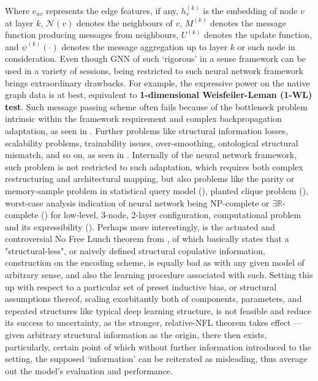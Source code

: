 Where $e_{uv}$ represents the edge features, if any, $h^{(k)}_{v}$ is the embedding of node $v$ at layer $k$, $\mathcal{N}(v)$ denotes the neighbours of $v$, $M^{(k)}$ denotes the message function producing messages from neighbours, $U^{(k)}$ denotes the update function, and $\psi^{(k)}(\cdot)$ denotes the message aggregation up to layer $k$ or such node in consideration. Even though GNN of such `rigorous' in a sense framework can be used in a variety of sessions, being restricted to such neural network framework brings extraordinary drawbacks. For example, the expressive power on the native graph data is at best, equivalent to \textbf{1-dimensional Weisfeiler-Leman (1-WL) test}. Such message passing scheme often fails because of the bottleneck problem intrinsic within the framework requirement and complex backpropagation adaptation, as seen in \cite{alon2021bottleneckgraphneuralnetworks}. Further problems like structural information losses, scalability problems, trainability issues, over-smoothing, ontological structural mismatch, and so on, as seen in \cite{NEURIPS2019_bb04af0f}. Internally of the neural network framework, such problem is not restricted to such adaptation, which requires both complex restructuring and architectural mapping, but also problems like the parity or memory-sample problem in statistical query model (\cite{blum2003noise,garg2021memory}), planted clique problem (\cite{barak2016nearly}), worst-case analysis indication of neural network being NP-complete or $\exists\mathbb{R}$-complete (\cite{blum1992training,abrahamsen2021existential}) for low-level, 3-node, 2-layer configuration, computational problem and its expressibility (\cite{eldan2016power,telgarsky2016benefits,siegelmann1991turing,weiss2018practical}). Perhaps more interestingly, is the actuated and controversial No Free Lunch theorem from \cite{wolpert1997nofree}, of which basically states that a "structural-less", or naively defined structural copulative information, construction on the encoding scheme, is equally bad as with any given model of arbitrary sense, and also the learning procedure associated with such. Setting this up with respect to a particular set of preset inductive bias, or structural assumptions thereof, scaling exorbitantly both of components, parameters, and repeated structures like typical deep learning structure, is not feasible and reduce its success to uncertainty, as the stronger, relative-NFL theorem takes effect --- given arbitrary structural information as the origin, there then exists, particularly, certain point of which without further information introduced to the setting, the supposed `information' can be reiterated as misleading, thus average out the model's evaluation and performance. 

